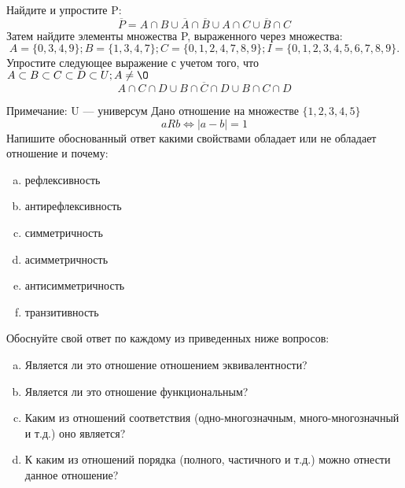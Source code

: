 \documentclass[10pt]{exam}
\begin{document}
\begin{questions}
\question
Найдите и упростите P:
\begin{equation*}
\overline{P} = A \cap B \cup \overline{A} \cap \overline{B} \cup A \cap C \cup \overline{B} \cap C
\end{equation*}
Затем найдите элементы множества P, выраженного через множества:
\begin{equation*}
A = \{0, 3, 4, 9\}; 
B = \{1, 3, 4, 7\};
C = \{0, 1, 2, 4, 7, 8, 9\};
I = \{0, 1, 2, 3, 4, 5, 6, 7, 8, 9\}.
\end{equation*}\question
Упростите следующее выражение с учетом того, что $A\subset B \subset C \subset D \subset U; A \neq \O$
\begin{equation*}
A \cap C  \cap D \cup B \cap \overline{C} \cap D \cup B \cap C \cap D
\end{equation*}

Примечание: U — универсум\question
Дано отношение на множестве $\{1, 2, 3, 4, 5\}$ 
\begin{equation*}
aRb \iff |a-b| = 1
\end{equation*}
Напишите обоснованный ответ какими свойствами обладает или не обладает отношение и почему:   
\begin{enumerate} [a)]\setcounter{enumi}{0}
\item рефлексивность
\item антирефлексивность
\item симметричность
\item асимметричность
\item антисимметричность
\item транзитивность
\end{enumerate}

Обоснуйте свой ответ по каждому из приведенных ниже вопросов:
\begin{enumerate} [a)]\setcounter{enumi}{0}
    \item Является ли это отношение отношением эквивалентности?
    \item Является ли это отношение функциональным?
    \item Каким из отношений соответствия (одно-многозначным, много-многозначный и т.д.) оно является?
    \item К каким из отношений порядка (полного, частичного и т.д.) можно отнести данное отношение?
\end{enumerate}


\end{questions}
\end{document}
